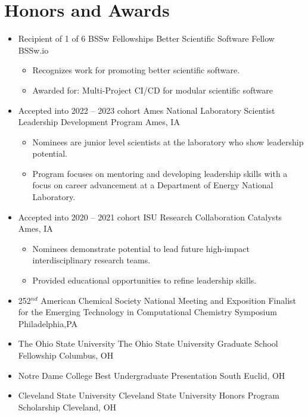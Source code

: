 \documentclass[11pt,a4paper,sans]{moderncv}
\begin{document}
\section{Honors and Awards}
\vspace{5pt}
\begin{itemize}
	\item{
		{Recipient of 1 of 6 BSSw Fellowships}
		{Better Scientific Software Fellow}
		{BSSw.io}
		{}
		{\begin{itemize}
			\item{Recognizes work for promoting better scientific software.}
			\item{Awarded for: Multi-Project CI/CD for modular scientific
				 software}
		\end{itemize}}
	}
	\item{
          {Accepted into 2022 -- 2023 cohort}
          {Ames National Laboratory Scientist Leadership Development Program}
          {Ames, IA}
          {}
          {\begin{itemize}
                  \item{Nominees are junior level scientists at the laboratory
                        who show leadership potential.}
                  \item{Program focuses on mentoring and developing leadership
                        skills with a focus on career advancement at a
                        Department of Energy National Laboratory.}
           \end{itemize}}}
    \item{
  		 {Accepted into 2020 -- 2021 cohort}
 		 {ISU Research Collaboration Catalysts}
		 {Ames, IA}
		 {}
		 {\begin{itemize}
   		      \item{Nominees demonstrate potential to lead future high-impact
   		      interdisciplinary research teams.}
   		      \item{Provided educational opportunities to refine leadership
   		      skills.}
   	 	  \end{itemize}}}
	\item{
		  {252$^{nd}$ American Chemical Society National Meeting and
		  	 Exposition}
	  	 {Finalist for the Emerging Technology in Computational Chemistry
	  	 	Symposium}
	  	 {Philadelphia,PA}
	  	 {}
	  	 {}}
	\item{
		  {The Ohio State University}
		  {The Ohio State University Graduate School Fellowship}
		  {Columbus, OH}
		  {}
		  {}}
	\item{
		  {Notre Dame College}
		  {Best Undergraduate Presentation}
		  {South Euclid, OH}
		  {}
		  {}}
	\item{
          {Cleveland State University}
          {Cleveland State University Honors Program Scholarship}
          {Cleveland, OH}
          {}
          {}}
\end{itemize}
\end{document}
